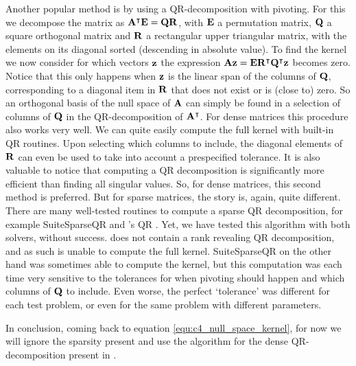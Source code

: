 Another popular\cite{trefethen_numerical_1997} method is by using a QR-decomposition with pivoting. For this we decompose the matrix as ${\vb{A}}^\intercal\vb{E} = \vb{Q} \vb{R}$, with $\vb{E}$ a permutation matrix, $\vb{Q}$ a square orthogonal matrix and $\vb{R}$ a rectangular upper triangular matrix, with the elements on its diagonal sorted (descending in absolute value). To find the kernel we now consider for which vectors $\vb{z}$ the expression $\vb{A} \vb{z} = \vb{E}{\vb{R}}^\intercal{\vb{Q}}^\intercal\vb{z}$ becomes zero. Notice that this only happens when $\vb{z}$ is the linear span of the columns of $\vb{Q}$, corresponding to a diagonal item in $\vb{R}$ that does not exist or is (close to) zero. So an orthogonal basis of the null space of $\vb{A}$ can simply be found in a selection of columns of $\vb{Q}$ in the QR-decomposition of ${\vb{A}}^\intercal$. For dense matrices this procedure also works very well. We can quite easily compute the full kernel with built-in QR routines. Upon selecting which columns to include, the diagonal elements of $\vb{R}$ can even be used to take into account a prespecified tolerance. It is also valuable to notice that computing a QR decomposition is significantly more efficient than finding all singular values. So, for dense matrices, this second method is preferred. But for sparse matrices, the story is, again, quite different. There are many well-tested routines to compute a sparse QR decomposition, for example SuiteSparseQR \cite{davis_algorithm_2011} and \Eigen's QR \cite{guennebaud_eigen_2010}. Yet, we have tested this algorithm with both solvers, without success. \Eigen does not contain a rank revealing QR decomposition, and as such is unable to compute the full kernel. SuiteSparseQR on the other hand was sometimes able to compute the kernel, but this computation was each time very sensitive to the tolerances for when pivoting should happen and which columns of $\vb{Q}$ to include. Even worse, the perfect `tolerance' was different for each test problem, or even for the same problem with different parameters.

In conclusion, coming back to equation \eqref{equ:c4_null_space_kernel}, for now we will ignore the sparsity present and use the algorithm for the dense QR-decomposition present in \Eigen \cite{guennebaud_eigen_2010}.

